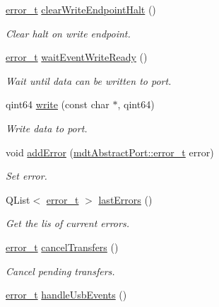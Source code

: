 \begin{DoxyCompactItemize}
\hyperlink{classmdt_abstract_port_ad4121bb930c95887e77f8bafa065a85e}{error\-\_\-t} \hyperlink{classmdt_usb_port_a2dd0f7c680fda1ca1247217fa4e3f2e8}{clear\-Write\-Endpoint\-Halt} ()
\begin{DoxyCompactList}\small\item\em Clear halt on write endpoint. \end{DoxyCompactList}\item 
\hyperlink{classmdt_abstract_port_ad4121bb930c95887e77f8bafa065a85e}{error\-\_\-t} \hyperlink{classmdt_usb_port_a3be875f6f10ae94fd3a94f925bb935e7}{wait\-Event\-Write\-Ready} ()
\begin{DoxyCompactList}\small\item\em Wait until data can be written to port. \end{DoxyCompactList}\item 
qint64 \hyperlink{classmdt_usb_port_ae777e33325ff2adef326dd7f81b00838}{write} (const char $\ast$, qint64)
\begin{DoxyCompactList}\small\item\em Write data to port. \end{DoxyCompactList}\item 
void \hyperlink{classmdt_usb_port_aa857e94b4167c53b26573042ee3af280}{add\-Error} (\hyperlink{classmdt_abstract_port_ad4121bb930c95887e77f8bafa065a85e}{mdt\-Abstract\-Port\-::error\-\_\-t} error)
\begin{DoxyCompactList}\small\item\em Set error. \end{DoxyCompactList}\item 
Q\-List$<$ \hyperlink{classmdt_abstract_port_ad4121bb930c95887e77f8bafa065a85e}{error\-\_\-t} $>$ \hyperlink{classmdt_usb_port_a81855cebd9b672a74d836955236c19bf}{last\-Errors} ()
\begin{DoxyCompactList}\small\item\em Get the lis of current errors. \end{DoxyCompactList}\item 
\hyperlink{classmdt_abstract_port_ad4121bb930c95887e77f8bafa065a85e}{error\-\_\-t} \hyperlink{classmdt_usb_port_afe5b473e1df8b828c17f83a45a3902fb}{cancel\-Transfers} ()
\begin{DoxyCompactList}\small\item\em Cancel pending transfers. \end{DoxyCompactList}\item 
\hyperlink{classmdt_abstract_port_ad4121bb930c95887e77f8bafa065a85e}{error\-\_\-t} \hyperlink{classmdt_usb_port_abb66e85fc1366112eeb0a6e86f6e7e32}{handle\-Usb\-Events} ()

\end{DoxyCompactItemize}
